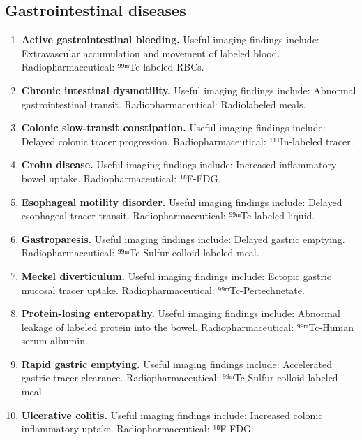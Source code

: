 \subsection{Gastrointestinal diseases}
\begin{enumerate}[leftmargin=*,itemsep=0.45em,topsep=0.4em]
\item \textbf{Active gastrointestinal bleeding.} Useful imaging findings include: Extravascular accumulation and movement of labeled blood. Radiopharmaceutical: ⁹⁹ᵐTc-labeled RBCs.
\item \textbf{Chronic intestinal dysmotility.} Useful imaging findings include: Abnormal gastrointestinal transit. Radiopharmaceutical: Radiolabeled meals.
\item \textbf{Colonic slow-transit constipation.} Useful imaging findings include: Delayed colonic tracer progression. Radiopharmaceutical: ¹¹¹In-labeled tracer.
\item \textbf{Crohn disease.} Useful imaging findings include: Increased inflammatory bowel uptake. Radiopharmaceutical: ¹⁸F-FDG.
\item \textbf{Esophageal motility disorder.} Useful imaging findings include: Delayed esophageal tracer transit. Radiopharmaceutical: ⁹⁹ᵐTc-labeled liquid.
\item \textbf{Gastroparesis.} Useful imaging findings include: Delayed gastric emptying. Radiopharmaceutical: ⁹⁹ᵐTc-Sulfur colloid-labeled meal.
\item \textbf{Meckel diverticulum.} Useful imaging findings include: Ectopic gastric mucosal tracer uptake. Radiopharmaceutical: ⁹⁹ᵐTc-Pertechnetate.
\item \textbf{Protein-losing enteropathy.} Useful imaging findings include: Abnormal leakage of labeled protein into the bowel. Radiopharmaceutical: ⁹⁹ᵐTc-Human serum albumin.
\item \textbf{Rapid gastric emptying.} Useful imaging findings include: Accelerated gastric tracer clearance. Radiopharmaceutical: ⁹⁹ᵐTc-Sulfur colloid-labeled meal.
\item \textbf{Ulcerative colitis.} Useful imaging findings include: Increased colonic inflammatory uptake. Radiopharmaceutical: ¹⁸F-FDG.
\end{enumerate}

